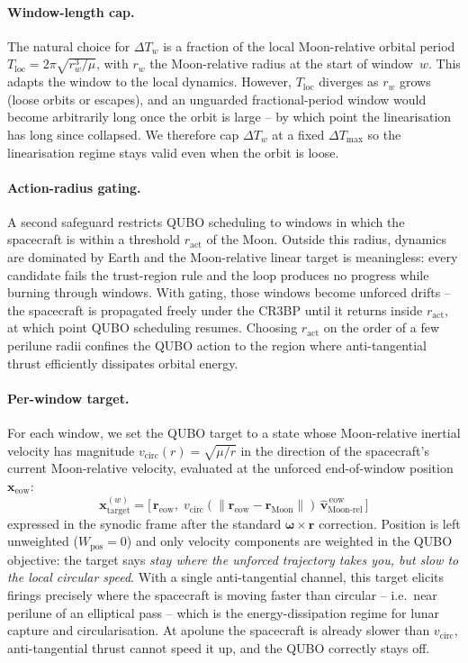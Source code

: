 \documentclass[8pt,a4paper]{article}
\newcommand{\bvec}[1]{\bm{#1}}
\newcommand{\xvec}{\bvec{x}}
\theoremstyle{definition}
\theoremstyle{remark}
\begin{document}
\paragraph{Window-length cap.} The natural choice for $\Delta T_w$
is a fraction of the local Moon-relative orbital period
$T_\mathrm{loc} = 2\pi\sqrt{r_w^3/\mu}$, with $r_w$ the
Moon-relative radius at the start of window~$w$. This adapts the
window to the local dynamics. However, $T_\mathrm{loc}$ diverges
as $r_w$ grows (loose orbits or escapes), and an unguarded
fractional-period window would become arbitrarily long once the
orbit is large -- by which point the linearisation has long since
collapsed. We therefore cap $\Delta T_w$ at a fixed
$\Delta T_\mathrm{max}$ so the linearisation regime stays valid
even when the orbit is loose.

\paragraph{Action-radius gating.} A second safeguard restricts QUBO
scheduling to windows in which the spacecraft is within a threshold
$r_\mathrm{act}$ of the Moon. Outside this radius, dynamics are
dominated by Earth and the Moon-relative linear target is
meaningless: every candidate fails the trust-region rule and the
loop produces no progress while burning through windows. With
gating, those windows become unforced drifts -- the spacecraft is
propagated freely under the CR3BP until it returns inside
$r_\mathrm{act}$, at which point QUBO scheduling resumes. Choosing
$r_\mathrm{act}$ on the order of a few perilune radii confines the
QUBO action to the region where anti-tangential thrust efficiently
dissipates orbital energy.

\paragraph{Per-window target.} For each window, we set the QUBO
target to a state whose Moon-relative inertial velocity has
magnitude $v_\mathrm{circ}(r) = \sqrt{\mu/r}$ in the direction of
the spacecraft's current Moon-relative velocity, evaluated at the
unforced end-of-window position $\xvec_\mathrm{eow}$:
\begin{equation}\label{eq:sw-target}
  \xvec_\mathrm{target}^{(w)}
  = \big[\,
      \bvec{r}_\mathrm{eow},\;
      v_\mathrm{circ}(\|\bvec{r}_\mathrm{eow} - \bvec{r}_\mathrm{Moon}\|)\,
      \hat{\bvec{v}}_\mathrm{Moon\text{-}rel}^{\,\mathrm{eow}}
    \,\big]
\end{equation}
expressed in the synodic frame after the standard $\bvec{\omega}\times\bvec{r}$
correction. Position is left unweighted ($W_\mathrm{pos} = 0$) and only
velocity components are weighted in the QUBO objective: the target
says \emph{stay where the unforced trajectory takes you, but slow to
the local circular speed}. With a single anti-tangential channel,
this target elicits firings precisely where the spacecraft is moving
faster than circular -- i.e.\ near perilune of an elliptical pass --
which is the energy-dissipation regime for lunar capture and
circularisation. At apolune the spacecraft is already slower than
$v_\mathrm{circ}$, anti-tangential thrust cannot speed it up, and
the QUBO correctly stays off.
\end{document}

